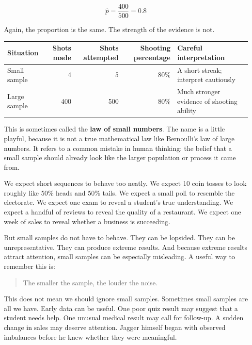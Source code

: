 \documentclass[
  letterpaper,
  DIV=11,
  numbers=noendperiod]{scrreprt}
\begin{document}
\[
\hat{p} = \frac{400}{500} = 0.8
\]

Again, the proportion is the same. The strength of the evidence is not.

\begin{table}
\fontsize{12.0pt}{14.0pt}\selectfont
\begin{tabular*}{\linewidth}{@{\extracolsep{\fill}}lrrrl}
\toprule
Situation & Shots made & Shots attempted & Shooting percentage & Careful interpretation \\ 
\midrule\addlinespace[2.5pt]
Small sample & 4 & 5 & 80\% & A short streak; interpret cautiously \\ 
Large sample & 400 & 500 & 80\% & Much stronger evidence of shooting ability \\ 
\bottomrule
\end{tabular*}
\end{table}

This is sometimes called the \textbf{law of small numbers}. The name is
a little playful, because it is not a true mathematical law like
Bernoulli's law of large numbers. It refers to a common mistake in human
thinking: the belief that a small sample should already look like the
larger population or process it came from.

We expect short sequences to behave too neatly. We expect 10 coin tosses
to look roughly like 50\% heads and 50\% tails. We expect a small poll
to resemble the electorate. We expect one exam to reveal a student's
true understanding. We expect a handful of reviews to reveal the quality
of a restaurant. We expect one week of sales to reveal whether a
business is succeeding.

But small samples do not have to behave. They can be lopsided. They can
be unrepresentative. They can produce extreme results. And because
extreme results attract attention, small samples can be especially
misleading. A useful way to remember this is:

\begin{quote}
The smaller the sample, the louder the noise.
\end{quote}

This does not mean we should ignore small samples. Sometimes small
samples are all we have. Early data can be useful. One poor quiz result
may suggest that a student needs help. One unusual medical result may
call for follow-up. A sudden change in sales may deserve attention.
Jagger himself began with observed imbalances before he knew whether
they were meaningful.
\end{document}
